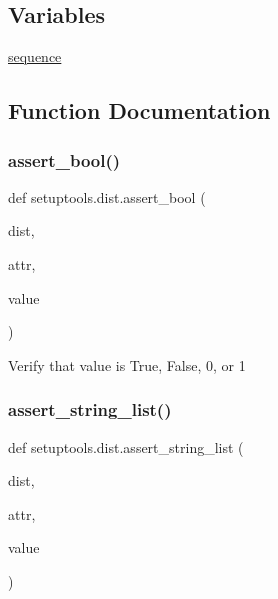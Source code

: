 \subsection*{Variables}
\begin{DoxyCompactItemize}
\item 
\hyperlink{namespacesetuptools_1_1dist_a990181c5330d133fd66d47c179a9395b}{sequence}
\end{DoxyCompactItemize}


\subsection{Function Documentation}
\mbox{\label{namespacesetuptools_1_1dist_a6248cc8e03decc97c768ba201e3a3244}} 
\subsubsection{\texorpdfstring{assert\+\_\+bool()}{assert\_bool()}}
{\footnotesize\ttfamily def setuptools.\+dist.\+assert\+\_\+bool (\begin{DoxyParamCaption}\item[{}]{dist,  }\item[{}]{attr,  }\item[{}]{value }\end{DoxyParamCaption})}

\begin{DoxyVerb}Verify that value is True, False, 0, or 1\end{DoxyVerb}
 \mbox{\label{namespacesetuptools_1_1dist_adef1021a792040663598a45748f8cf95}} 
\subsubsection{\texorpdfstring{assert\+\_\+string\+\_\+list()}{assert\_string\_list()}}
{\footnotesize\ttfamily def setuptools.\+dist.\+assert\+\_\+string\+\_\+list (\begin{DoxyParamCaption}\item[{}]{dist,  }\item[{}]{attr,  }\item[{}]{value }\end{DoxyParamCaption})}

